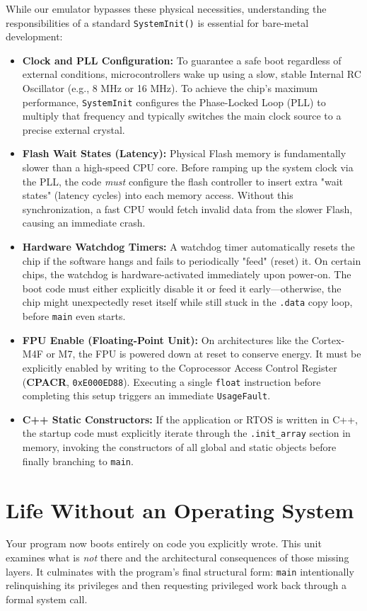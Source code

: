 While our emulator bypasses these physical necessities, understanding the responsibilities of a standard \texttt{SystemInit()} is essential for bare-metal development:
\begin{itemize}
    \item \textbf{Clock and PLL Configuration:} To guarantee a safe boot regardless of external conditions, microcontrollers wake up using a slow, stable Internal RC Oscillator (e.g., 8 MHz or 16 MHz). To achieve the chip's maximum performance, \texttt{SystemInit} configures the Phase-Locked Loop (PLL) to multiply that frequency and typically switches the main clock source to a precise external crystal.
    \item \textbf{Flash Wait States (Latency):} Physical Flash memory is fundamentally slower than a high-speed CPU core. Before ramping up the system clock via the PLL, the code \textit{must} configure the flash controller to insert extra "wait states" (latency cycles) into each memory access. Without this synchronization, a fast CPU would fetch invalid data from the slower Flash, causing an immediate crash.
    \item \textbf{Hardware Watchdog Timers:} A watchdog timer automatically resets the chip if the software hangs and fails to periodically "feed" (reset) it. On certain chips, the watchdog is hardware-activated immediately upon power-on. The boot code must either explicitly disable it or feed it early—otherwise, the chip might unexpectedly reset itself while still stuck in the \texttt{.data} copy loop, before \texttt{main} even starts.
    \item \textbf{FPU Enable (Floating-Point Unit):} On architectures like the Cortex-M4F or M7, the FPU is powered down at reset to conserve energy. It must be explicitly enabled by writing to the Coprocessor Access Control Register (\textbf{CPACR}, \texttt{0xE000ED88}). Executing a single \texttt{float} instruction before completing this setup triggers an immediate \texttt{UsageFault}.
    \item \textbf{C++ Static Constructors:} If the application or RTOS is written in C++, the startup code must explicitly iterate through the \texttt{.init\_array} section in memory, invoking the constructors of all global and static objects before finally branching to \texttt{main}.
\end{itemize}

\section{Life Without an Operating System}
Your program now boots entirely on code you explicitly wrote. This unit examines what is \textit{not} there and the architectural consequences of those missing layers. It culminates with the program's final structural form: \texttt{main} intentionally relinquishing its privileges and then requesting privileged work back through a formal system call.

